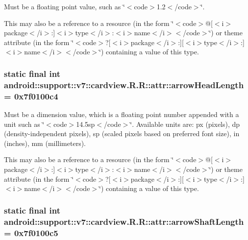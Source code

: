 Must be a floating point value, such as \char`\"{}$<$code$>$1.2$<$/code$>$\char`\"{}. 

This may also be a reference to a resource (in the form \char`\"{}$<$code$>$@\mbox{[}$<$i$>$package$<$/i$>$:\mbox{]}$<$i$>$type$<$/i$>$:$<$i$>$name$<$/i$>$$<$/code$>$\char`\"{}) or theme attribute (in the form \char`\"{}$<$code$>$?\mbox{[}$<$i$>$package$<$/i$>$:\mbox{]}\mbox{[}$<$i$>$type$<$/i$>$:\mbox{]}$<$i$>$name$<$/i$>$$<$/code$>$\char`\"{}) containing a value of this type. \hypertarget{classandroid_1_1support_1_1v7_1_1cardview_1_1_r_1_1attr_61c84d87413d80dd94843c28dea34bcd}{
\subsubsection[{arrowHeadLength}]{\setlength{\rightskip}{0pt plus 5cm}static final int android::support::v7::cardview.R.R::attr::arrowHeadLength = 0x7f0100c4}}
\label{classandroid_1_1support_1_1v7_1_1cardview_1_1_r_1_1attr_61c84d87413d80dd94843c28dea34bcd}


Must be a dimension value, which is a floating point number appended with a unit such as \char`\"{}$<$code$>$14.5sp$<$/code$>$\char`\"{}. Available units are: px (pixels), dp (density-independent pixels), sp (scaled pixels based on preferred font size), in (inches), mm (millimeters). 

This may also be a reference to a resource (in the form \char`\"{}$<$code$>$@\mbox{[}$<$i$>$package$<$/i$>$:\mbox{]}$<$i$>$type$<$/i$>$:$<$i$>$name$<$/i$>$$<$/code$>$\char`\"{}) or theme attribute (in the form \char`\"{}$<$code$>$?\mbox{[}$<$i$>$package$<$/i$>$:\mbox{]}\mbox{[}$<$i$>$type$<$/i$>$:\mbox{]}$<$i$>$name$<$/i$>$$<$/code$>$\char`\"{}) containing a value of this type. \hypertarget{classandroid_1_1support_1_1v7_1_1cardview_1_1_r_1_1attr_374c261f3d7c59fe202b624515fc58b4}{
\subsubsection[{arrowShaftLength}]{\setlength{\rightskip}{0pt plus 5cm}static final int android::support::v7::cardview.R.R::attr::arrowShaftLength = 0x7f0100c5}}
\label{classandroid_1_1support_1_1v7_1_1cardview_1_1_r_1_1attr_374c261f3d7c59fe202b624515fc58b4}


